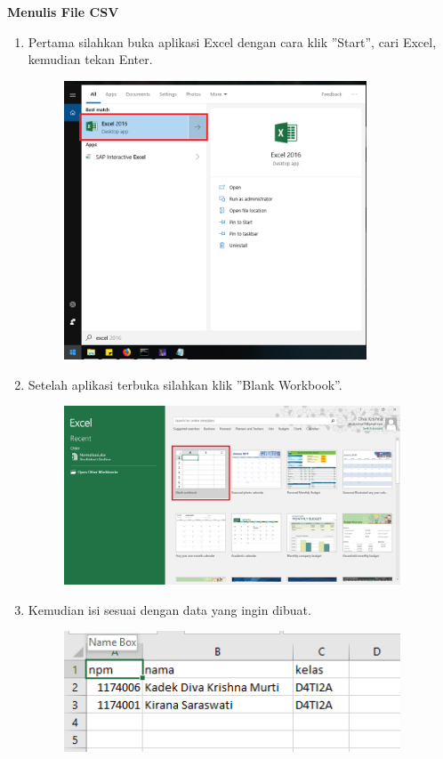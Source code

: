 \begin{enumerate}
	\textbf{Menulis File CSV}
	
	\begin{enumerate}
		\item Pertama silahkan buka aplikasi Excel dengan cara klik ''Start'', cari Excel, kemudian tekan Enter.
		
		\begin{figure}[H]
			\includegraphics[width=9cm]{figures/diva/Chapter4/t1.png}
			\centering
		\end{figure}
		
		\item Setelah aplikasi terbuka silahkan klik ''Blank Workbook''.
		
		\begin{figure}[H]
			\includegraphics[width=10cm]{figures/diva/Chapter4/t2.png}
			\centering
		\end{figure}
		
		\item Kemudian isi sesuai dengan data yang ingin dibuat.
		
		\begin{figure}[H]
			\includegraphics[width=10cm]{figures/diva/Chapter4/t3.png}
			\centering
		\end{figure}
		

\end{enumerate}
\end{enumerate}
